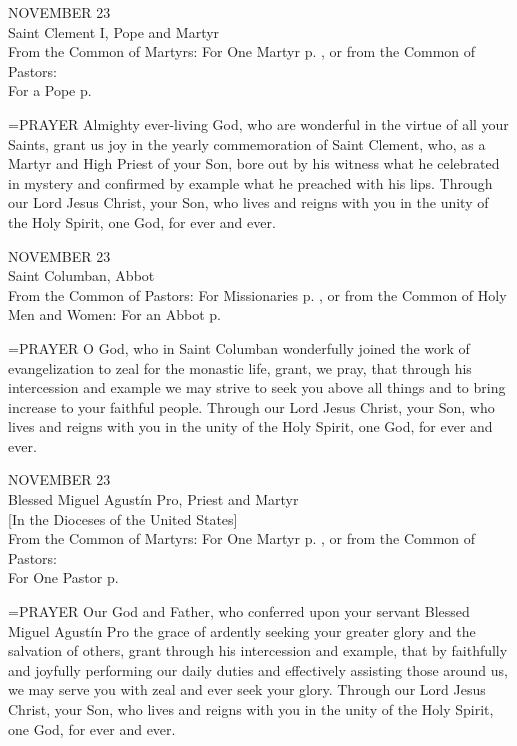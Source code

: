\begin{center}\normalsize NOVEMBER 23\\
\footnotesize Saint Clement I, Pope and Martyr\\
\footnotesize From the Common of Martyrs: For One Martyr p.   , or from the Common of Pastors:\\
\footnotesize For a Pope p.\\
\end{center}

\hangindent=\parindent \small{PRAYER 
Almighty ever-living God,
who are wonderful in the virtue of all your Saints,
grant us joy in the yearly commemoration of Saint Clement,
who, as a Martyr and High Priest of your Son,
bore out by his witness what he celebrated in mystery
and confirmed by example what he preached with his lips.
Through our Lord Jesus Christ, your Son,
who lives and reigns with you in the unity of the Holy Spirit,
one God, for ever and ever.\\}
 
\begin{center}\normalsize NOVEMBER 23\\
\footnotesize Saint Columban, Abbot\\
\footnotesize From the Common of Pastors: For Missionaries p.   , or from the Common of Holy\\
\footnotesize Men and Women: For an Abbot p. \\
\end{center}

\hangindent=\parindent \small{PRAYER 
O God, who in Saint Columban
wonderfully joined the work of evangelization
to zeal for the monastic life,
grant, we pray,
that through his intercession and example
we may strive to seek you above all things
and to bring increase to your faithful people.
Through our Lord Jesus Christ, your Son,
who lives and reigns with you in the unity of the Holy Spirit,
one God, for ever and ever.\\}
 
\begin{center}\normalsize NOVEMBER 23\\
\footnotesize Blessed Miguel Agustín Pro, Priest and Martyr\\
\footnotesize [In the Dioceses of the United States]\\
\footnotesize From the Common of Martyrs: For One Martyr p.   , or from the Common of Pastors:\\
\footnotesize For One Pastor p.\\
\end{center}

\hangindent=\parindent \small{PRAYER 
Our God and Father,
who conferred upon your servant Blessed Miguel Agustín Pro
the grace of ardently seeking your greater glory
and the salvation of others,
grant through his intercession and example, that by faithfully and joyfully performing our daily duties
and effectively assisting those around us,
we may serve you with zeal
and ever seek your glory.
Through our Lord Jesus Christ, your Son,
who lives and reigns with you in the unity of the Holy Spirit,
one God, for ever and ever.\\}
 
